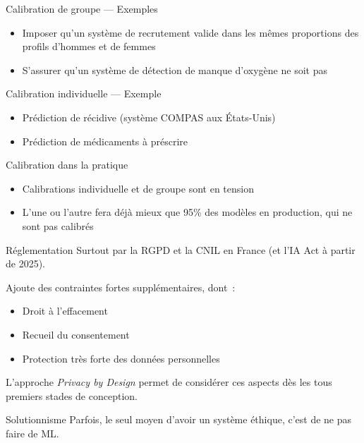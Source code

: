 \begin{frame}{Calibration de groupe — Exemples}
  \begin{itemize}
    \item Imposer qu'un système de recrutement valide dans les mêmes proportions des profils d'hommes et de femmes
    \item S'assurer qu'un système de détection de manque d'oxygène ne soit pas 
  \end{itemize}
\end{frame}

\begin{frame}{Calibration individuelle — Exemple}
  \begin{itemize}
    \item Prédiction de récidive (système COMPAS aux États-Unis)
    \item Prédiction de médicaments à préscrire
  \end{itemize}
\end{frame}

\begin{frame}{Calibration dans la pratique}
  \begin{itemize}
    \item Calibrations individuelle et de groupe sont en tension
    \item L'une ou l'autre fera déjà mieux que 95\% des modèles en production, qui ne sont pas calibrés
  \end{itemize}
\end{frame}

\begin{frame}{Réglementation}
  Surtout par la RGPD et la CNIL en France (et l'IA Act à partir de 2025).

  Ajoute des contraintes fortes supplémentaires, dont~:

  \begin{itemize}
    \item Droit à l'effacement
    \item Recueil du consentement
    \item Protection très forte des données personnelles
  \end{itemize}

  L'approche \textit{Privacy by Design} permet de considérer ces aspects dès les tous premiers stades de conception.
\end{frame}

\begin{frame}{Solutionnisme}
  Parfois, le seul moyen d'avoir un système éthique, c'est de \alert{ne pas} faire de ML.
\end{frame}